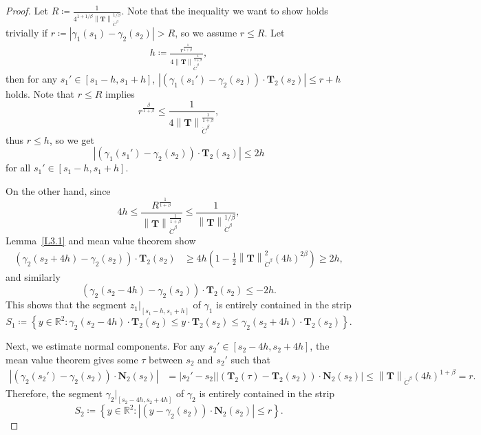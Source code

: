\documentclass[reqno,centertags,12pt]{amsart}
\theoremstyle{definition}
\numberwithin{equation}{section}
\newcommand{\abs}[1]{\left\lvert#1\right\rvert}
\newcommand{\norm}[1]{\left\|#1\right\|}
\newcommand{\setbc}[2]{\left\{ #1\colon#2 \right\}}
\newcommand{\bbR}{{\mathbb{R}}}
\begin{document}
\begin{proof}
    Let $R\coloneqq \frac{1}{4^{1+1/\beta}
    \norm{\mathbf{T}}_{\dot{C}^{\beta}}^{1/\beta}}$. Note that the inequality we want
    to show holds trivially if $r\coloneqq\abs{\gamma_{1}(s_{1}) - \gamma_{2}(s_{2})}>R$,
    so we assume $r\leq R$. Let
    \begin{align*}
        h\coloneqq \frac{r^{\frac{1}{1+\beta}}}
        {4\norm{\mathbf{T}}_{\dot{C}^{\beta}}^{\frac{1}{1+\beta}}},
    \end{align*}
    then for any $s_{1}' \in [s_{1} - h, s_{1} + h]$,
    $\abs{(\gamma_{1}(s_{1}') - \gamma_{2}(s_{2}))\cdot \mathbf{T}_{2}(s_{2})}\leq r + h$
    holds. Note that $r\leq R$ implies
    \[
        r^{\frac{\beta}{1+\beta}} \leq \frac{1}
        {4\norm{\mathbf{T}}_{\dot{C}^{\beta}}^{\frac{1}{1+\beta}}},
    \]
    thus $r\leq h$, so we get
    \[
        \abs{(\gamma_{1}(s_{1}') - \gamma_{2}(s_{2}))\cdot \mathbf{T}_{2}(s_{2})} \leq 2h
    \]
    for all $s_{1}' \in [s_{1} - h, s_{1} + h]$.

    On the other hand, since
    \[
        4h \leq \frac{R^{\frac{1}{1+\beta}}}
        {\norm{\mathbf{T}}_{\dot{C}^{\beta}}^{\frac{1}{1+\beta}}}
        \leq \frac{1}{\norm{\mathbf{T}}_{\dot{C}^{\beta}}^{1/\beta}},
    \]
    Lemma~\ref{L3.1} and mean value theorem show
    \begin{align*}
        (\gamma_{2}(s_{2}+4h) - \gamma_{2}(s_{2}))\cdot \mathbf{T}_{2}(s_{2})
        &\geq 4h\left(
            1 - \frac{1}{2}\norm{\mathbf{T}}_{\dot{C}^{\beta}}^{2}
            (4h)^{2\beta}
        \right)
        \geq 2h,
    \end{align*}
    and similarly
    \[
        (\gamma_{2}(s_{2}-4h) - \gamma_{2}(s_{2}))\cdot \mathbf{T}_{2}(s_{2}) \leq -2h.
    \]
    This shows that the segment $z_{1}|_{[s_{1}-h,s_{1}+h]}$ of $\gamma_{1}$
    is entirely contained in the strip
    \[
        S_{1}\coloneqq \setbc{y\in\bbR^{2}}
        {\gamma_{2}(s_{2}-4h)\cdot \mathbf{T}_{2}(s_{2})
        \leq y\cdot\mathbf{T}_{2}(s_{2})
        \leq \gamma_{2}(s_{2}+4h)\cdot \mathbf{T}_{2}(s_{2})}.
    \]

    Next, we estimate normal components. For any $s_{2}'\in[s_{2}-4h,s_{2}+4h]$,
    the mean value theorem gives some $\tau$ between $s_{2}$ and $s_{2}'$ such that
    \begin{align*}
        \abs{(\gamma_{2}(s_{2}') - \gamma_{2}(s_{2}))\cdot\mathbf{N}_{2}(s_{2})}
        &=\abs{s_{2}' - s_{2}}
        \abs{(\mathbf{T}_{2}(\tau) - \mathbf{T}_{2}(s_{2}))\cdot\mathbf{N}_{2}(s_{2})}
        \leq \norm{\mathbf{T}}_{\dot{C}^{\beta}}(4h)^{1+\beta} = r.
    \end{align*}
    Therefore, the segment $\gamma_{2}|_{[s_{2}-4h,s_{2}+4h]}$
    of $\gamma_{2}$ is entirely contained in the strip
    \[
        S_{2}\coloneqq \setbc{y\in\bbR^{2}}
        {\abs{(y - \gamma_{2}(s_{2}))\cdot\mathbf{N}_{2}(s_{2})} \leq r}.
    \]


\end{proof}
\end{document}
